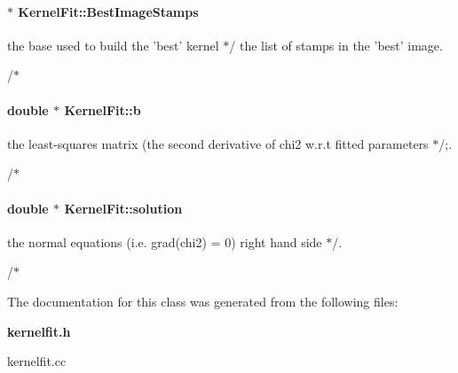 \paragraph{ $\ast$ Kernel\-Fit::Best\-Image\-Stamps}\hfill\label{class_kernelfit_m8}


the base used to build the 'best' kernel $\ast$/ the list of stamps in the 'best' image.

/$\ast$ 
\paragraph{\setlength{\rightskip}{0pt plus 5cm}double $\ast$ Kernel\-Fit::b}\hfill\label{class_kernelfit_m16}


the least-squares matrix (the second derivative of chi2 w.r.t fitted parameters $\ast$/;.

/$\ast$ 
\paragraph{\setlength{\rightskip}{0pt plus 5cm}double $\ast$ Kernel\-Fit::solution}\hfill\label{class_kernelfit_m17}


the normal equations (i.e. grad(chi2) = 0) right hand side $\ast$/.

/$\ast$ 

The documentation for this class was generated from the following files:\begin{CompactItemize}
\item 
{\bf kernelfit.h}\item 
kernelfit.cc\end{CompactItemize}
